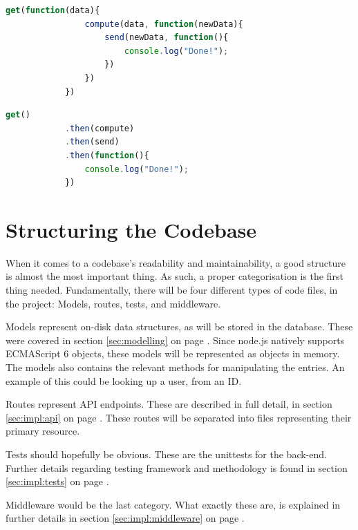 		\begin{lstlisting}[language=Javascript,gobble=12,caption={Chaining data between callbacks in node.js},label={lst:node:callbackhell}]
            get(function(data){
                compute(data, function(newData){
                    send(newData, function(){
                        console.log("Done!");
                    })
                })
            })
		\end{lstlisting}
		
		\begin{lstlisting}[language=Javascript,gobble=12,caption={Chaining data between promises in node.js},label={lst:node:promisegoodness}]
            get()
            .then(compute)
            .then(send)
            .then(function(){
                console.log("Done!");
            })
		\end{lstlisting}

	\section{Structuring the Codebase}
		\label{sec:impl:backend:codebase}
		When it comes to a codebase's readability and maintainability, a good structure is almost the most important thing. As such, a proper categorisation is the first thing needed. Fundamentally, there will be four different types of code files, in the project: Models, routes, tests, and middleware.

		Models represent on-disk data structures, as will be stored in the database. These were covered in section \ref{sec:modelling} on page \pageref{sec:modelling}. Since node.js natively supports ECMAScript 6 objects, these models will be represented as objects in memory. The models also contains the relevant methods for manipulating the entries. An example of this could be looking up a user, from an ID.

		Routes represent API endpoints. These are described in full detail, in section \ref{sec:impl:api} on page \pageref{sec:impl:api}. These routes will be separated into files representing their primary resource.

		Tests should hopefully be obvious. These are the unittests for the back-end. Further details regarding testing framework and methodology is found in section \ref{sec:impl:tests} on page \pageref{sec:impl:tests}.

		Middleware would be the last category. What exactly these are, is explained in further details in section \ref{sec:impl:middleware} on page \pageref{sec:impl:middleware}.

